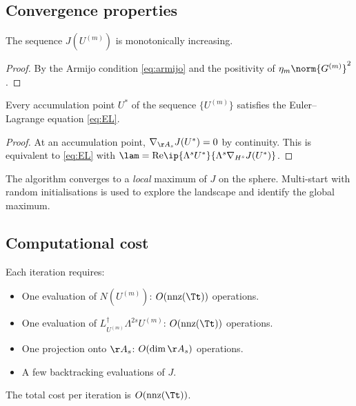 \subsection{Convergence properties}
\label{ssec:C-convergence}

\begin{proposition}\label{prop:C-monotone}
The sequence $J(U^{(m)})$ is monotonically increasing.
\end{proposition}

\begin{proof}
By the Armijo condition \eqref{eq:armijo} and the positivity of 
$\eta_m\norm{G^{(m)}}^2$.
\end{proof}

\begin{proposition}\label{prop:C-stationary}
Every accumulation point $U^\ast$ of the sequence 
$\{U^{(m)}\}$ satisfies the Euler--Lagrange equation 
\eqref{eq:EL}.
\end{proposition}

\begin{proof}
At an accumulation point, $\nabla_{\AA_s}J(U^\ast)=0$ by 
continuity. This is equivalent to \eqref{eq:EL} with 
$\lam = \mathrm{Re}\ip{\Lambda^s U^\ast}{\Lambda^s\nabla_{H^s}J(U^\ast)}$.
\end{proof}

\begin{remark}\label{rem:global}
The algorithm converges to a \emph{local} maximum of $J$ on the 
sphere. Multi-start with random initialisations is used to explore 
the landscape and identify the global maximum.
\end{remark}

\subsection{Computational cost}
\label{ssec:C-cost}

Each iteration requires:
\begin{itemize}[leftmargin=*]
\item One evaluation of $N(U^{(m)})$: $O(\operatorname{nnz}(\Tt))$ 
      operations.
\item One evaluation of $L_{U^{(m)}}^\dagger\Lambda^{2s}U^{(m)}$: 
      $O(\operatorname{nnz}(\Tt))$ operations.
\item One projection onto $\AA_s$: $O(\dim\AA_s)$ operations.
\item A few backtracking evaluations of $J$.
\end{itemize}
The total cost per iteration is $O(\operatorname{nnz}(\Tt))$.

